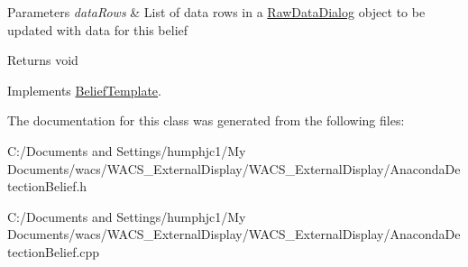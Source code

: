 \begin{DoxyParams}{Parameters}
{\em dataRows} & List of data rows in a \hyperlink{class_raw_data_dialog}{RawDataDialog} object to be updated with data for this belief \\
\hline
\end{DoxyParams}
\begin{DoxyReturn}{Returns}
void 
\end{DoxyReturn}


Implements \hyperlink{class_belief_template_a72e58b1d025012f3f2572a8983e8355c}{BeliefTemplate}.



The documentation for this class was generated from the following files:\begin{DoxyCompactItemize}
\item 
C:/Documents and Settings/humphjc1/My Documents/wacs/WACS\_\-ExternalDisplay/WACS\_\-ExternalDisplay/AnacondaDetectionBelief.h\item 
C:/Documents and Settings/humphjc1/My Documents/wacs/WACS\_\-ExternalDisplay/WACS\_\-ExternalDisplay/AnacondaDetectionBelief.cpp\end{DoxyCompactItemize}
